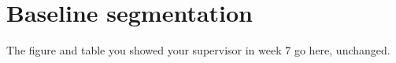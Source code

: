 \section{Baseline segmentation}
\label{sec:baseline}

The figure and table you showed your supervisor in week 7 go here, unchanged.
